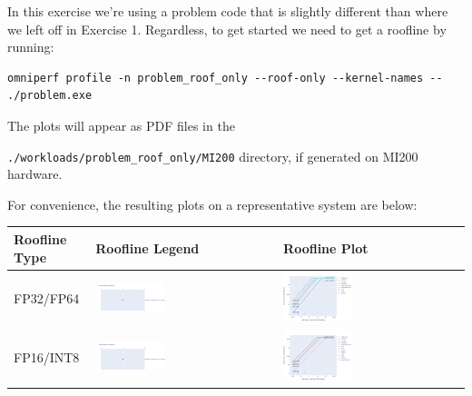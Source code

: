 \documentclass[
]{article}
\let\oldtexttt\texttt
\renewcommand{\texttt}[1]{
  \colorbox{Light}{\oldtexttt{#1}}
}
\begin{document}
In this exercise we're using a problem code that is slightly different
than where we left off in Exercise 1. Regardless, to get started we need
to get a roofline by running:

\begin{verbatim}
omniperf profile -n problem_roof_only --roof-only --kernel-names -- ./problem.exe
\end{verbatim}

The plots will appear as PDF files in the
\texttt{./workloads/problem\_roof\_only/MI200} directory, if generated
on MI200 hardware.

For convenience, the resulting plots on a representative system are
below: 
\begin{longtable}[]{@{}lll@{}}
\toprule
Roofline Type & Roofline Legend & Roofline Plot\tabularnewline
\midrule
\endhead
FP32/FP64 &
\includegraphics[width=0.4\textwidth,height=0.4\textheight]{omniperf/lds_occupancy_limit/8575851bf3f9ac056a2eae0e721d44cde6e9378a.png}&
\includegraphics[width=0.4\textwidth,height=0.4\textheight]{omniperf/lds_occupancy_limit/4d764154064d3674ca5c2af5fb80628acc72ed5f.png}
\tabularnewline
FP16/INT8 &
\includegraphics[width=0.4\textwidth,height=0.4\textheight] {omniperf/lds_occupancy_limit/8575851bf3f9ac056a2eae0e721d44cde6e9378a.png}&\includegraphics[width=0.4\textwidth,height=0.4\textheight]{omniperf/lds_occupancy_limit/3358562c2f0191026aa2588c4523ff78fb2e6a6a.png}\tabularnewline
\bottomrule
\end{longtable}
\end{document}
